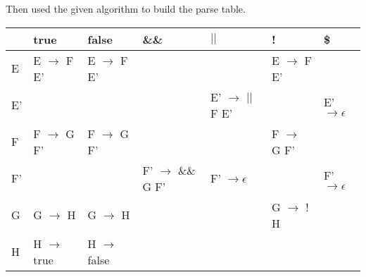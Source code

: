 \documentclass{article}
\begin{document}
    Then used the given algorithm to build the parse table.
    \begin{center}
        \begin{tabular}{|l||l|l|l|l|l|l|}
            \hline
            & true & false & \&\& & $||$ & ! & \$ \\
            \hline \hline
            E  & E $\to$ F E' & E $\to$ F E'  &                    &                    & E $\to$ F E' &                   \\ \hline
            E' &              &               &                    & E' $\to$ $||$ F E' &              & E' $\to \epsilon$ \\ \hline
            F  & F $\to$ G F' & F $\to$ G F'  &                    &                    & F $\to$ G F' &                   \\ \hline
            F' &              &               & F' $\to$ \&\& G F' & F' $\to \epsilon$  &              & F' $\to \epsilon$ \\ \hline
            G  & G $\to$ H    & G $\to$ H     &                    &                    & G $\to$ ! H  &                   \\ \hline
            H  & H $\to$ true & H $\to$ false &                    &                    &              &                   \\ \hline
        \end{tabular}
    \end{center}
\end{document}
